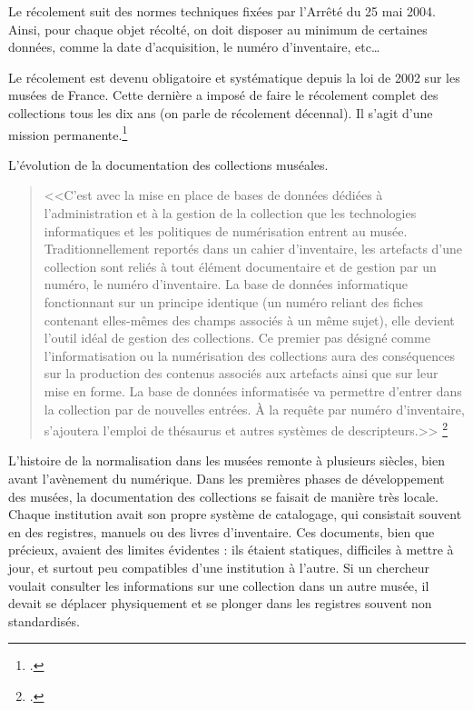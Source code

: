 Le récolement suit des normes techniques fixées par l’Arrêté du 25 mai 2004. Ainsi, pour chaque objet récolté, on doit disposer au minimum de certaines données, comme la date d’acquisition, le numéro d’inventaire, etc…\newline

Le récolement est devenu obligatoire et systématique depuis la loi de 2002 sur les musées de France. Cette dernière a imposé de faire le récolement complet des collections tous les dix ans (on parle de récolement décennal). Il s’agit d’une mission permanente.\footcite{recolement}\newline

L'évolution de la documentation des collections muséales.\newline

\begin{quote}
    <<C’est avec la mise en place de bases de données dédiées à l’administration et à la gestion de la collection que les technologies informatiques et les politiques de numérisation entrent au musée. Traditionnellement reportés dans un cahier d’inventaire, les artefacts d’une collection sont reliés à tout élément documentaire et de gestion par un numéro, le numéro d’inventaire. La base de données informatique fonctionnant sur un principe identique (un numéro reliant des fiches contenant elles-mêmes des champs associés à un même sujet), elle devient l’outil idéal de gestion des collections. Ce premier pas désigné comme l’informatisation ou la numérisation des collections aura des conséquences sur la production des contenus associés aux artefacts ainsi que sur leur mise en forme. La base de données informatisée va permettre d’entrer dans la collection par de nouvelles entrées. À la requête par numéro d’inventaire, s’ajoutera l’emploi de thésaurus et autres systèmes de descripteurs.>> \footcite{andreacola_2014}
\end{quote}
L’histoire de la normalisation dans les musées remonte à plusieurs siècles, bien avant l’avènement du numérique. Dans les premières phases de développement des musées, la documentation des collections se faisait de manière très locale. Chaque institution avait son propre système de catalogage, qui consistait souvent en des registres, manuels ou des livres d’inventaire. Ces documents, bien que précieux, avaient des limites évidentes : ils étaient statiques, difficiles à mettre à jour, et surtout peu compatibles d’une institution à l’autre. Si un chercheur voulait consulter les informations sur une collection dans un autre musée, il devait se déplacer physiquement et se plonger dans les registres souvent non standardisés.\newline

